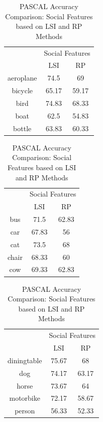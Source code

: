 \begin{table}[!ht]
\caption{ PASCAL Accuracy Comparison: Social Features based on LSI and RP Methods} %
\centering
\begin{tabular}{|c|c|c|}
 \hline
{\multirow{2}{*}{Labels}} & \multicolumn{2}{|c|}{Social Features} \\
\cline{2-3}
 & LSI & RP \\  [1ex] \hline
aeroplane & 74.5 & 69 \\  [1ex] \hline
bicycle & 65.17 & 59.17 \\  [1ex] \hline
bird & 74.83 & 68.33 \\  [1ex] \hline
boat & 62.5 & 54.83 \\  [1ex] \hline
bottle & 63.83 & 60.33 \\  [1ex] \hline
\end{tabular}
 \hspace{1em}\vspace*{0.5cm}
 \begin{tabular}{|c|c|c|}
  \hline
{\multirow{2}{*}{Labels}} & \multicolumn{2}{|c|}{Social Features} \\ \cline{2-3}
 & LSI & RP \\ \hline
bus & 71.5 & 62.83 \\  [1ex] \hline
car & 67.83 & 56 \\  [1ex] \hline
cat & 73.5 & 68 \\  [1ex] \hline
chair & 68.33 & 60 \\  [1ex] \hline
cow & 69.33 & 62.83 \\  [1ex] \hline
\end{tabular}
 \hspace{1em}\vspace*{0.5cm}
 \begin{tabular}{|c|c|c|}
  \hline
{\multirow{2}{*}{Labels}} & \multicolumn{2}{|c|}{Social Features} \\ \cline{2-3}
 & LSI & RP \\ \hline
diningtable & 75.67 & 68 \\  [1ex] \hline
dog & 74.17 & 63.17 \\  [1ex] \hline
horse & 73.67 & 64 \\  [1ex] \hline
motorbike & 72.17 & 58.67 \\  [1ex] \hline
person & 56.33 & 52.33 \\  [1ex] \hline
\end{tabular}
 \hspace{1em}\vspace*{0.5cm}

\end{table}
